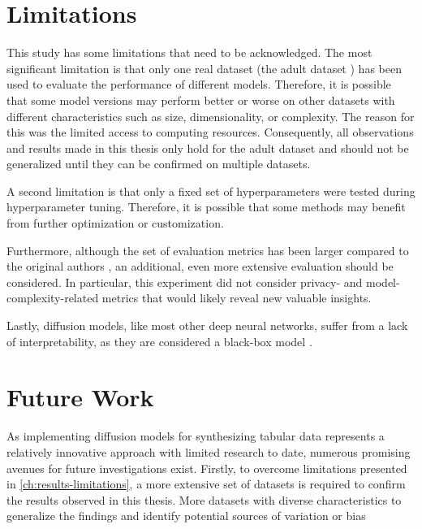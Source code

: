 \section{Limitations}
\label{ch:results-limitations}

This study has some limitations that need to be acknowledged.
The most significant limitation is that only one real dataset (the adult dataset \cite{Dua:2019}) has been used to evaluate the performance of different models.
Therefore, it is possible that some model versions may perform better or worse on other datasets with different characteristics such as size, dimensionality, or complexity.
The reason for this was the limited access to computing resources.
Consequently, all observations and results made in this thesis only hold for the adult dataset and should not be generalized until they can be confirmed on multiple datasets.

A second limitation is that only a fixed set of hyperparameters were tested during hyperparameter tuning.
Therefore, it is possible that some methods may benefit from further optimization or customization.

Furthermore, although the set of evaluation metrics has been larger compared to the original authors \cite{kotelnikov2022TabDDPMModellingTabular},
an additional, even more extensive evaluation should be considered.
In particular, this experiment did not consider privacy- and model-complexity-related metrics that would likely reveal new valuable insights.

Lastly, diffusion models, like most other deep neural networks, suffer from a lack of interpretability, as they are considered a black-box model \cite{benitez1997AreArtificialNeural}.

\section{Future Work}
\label{ch:results-futureWork}

As implementing diffusion models for synthesizing tabular data represents a relatively innovative approach with limited research to date, numerous promising avenues for future investigations exist.
Firstly, to overcome limitations presented in \autoref{ch:results-limitations}, a more extensive set of datasets is required to confirm the results observed in this thesis.
More datasets with diverse characteristics to generalize the findings and identify potential sources of variation or bias

